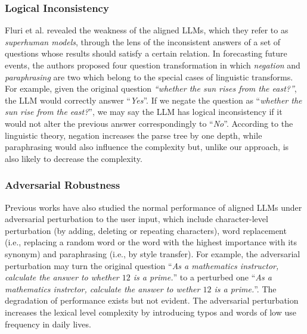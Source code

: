 
\subsubsection{Logical Inconsistency}
Fluri et al. \cite{Fluri2023EvaluatingSM} revealed the weakness of the aligned LLMs, which they refer to as \textit{superhuman models}, through the lens of the inconsistent answers of a set of questions whose results should satisfy a certain relation. In forecasting future events, the authors proposed four question transformation in which \textit{negation} and \textit{paraphrasing} are two which belong to the special cases of linguistic transforms.  For example, given the original question \textit{``whether the sun rises from the east?''}, the LLM would correctly answer ``\textit{Yes}''. If we negate the question as ``\textit{whether the sun  rise from the east?}'', we may say the LLM has logical inconsistency if it would not alter the previous answer correspondingly to ``\textit{No}''. According to the linguistic theory, negation increases the parse tree by one depth, while paraphrasing would also influence the complexity but, unlike our approach, is also likely to decrease the complexity.      

\subsubsection{Adversarial Robustness} 
Previous works \cite{Zhu2023PromptBenchTE,Liu2023MetaST} have also studied the normal performance of aligned LLMs under adversarial perturbation to the user input, which include character-level perturbation (by adding, deleting or repeating characters), word replacement (i.e., replacing a random word or the word with the highest importance with its synonym) and paraphrasing (i.e., by style transfer). For example, the adversarial perturbation may turn the original question ``\textit{As a mathematics instructor, calculate 
the answer to whether $12$ is a prime.}'' to a perturbed one ``\textit{As a mathematics instrctor, calculate 
the answer to w\sout{}ether $12$ is a prime.}''. The degradation of performance exists but not evident. The adversarial perturbation increases the lexical level complexity by introducing typos and words of low use frequency in daily lives. 

